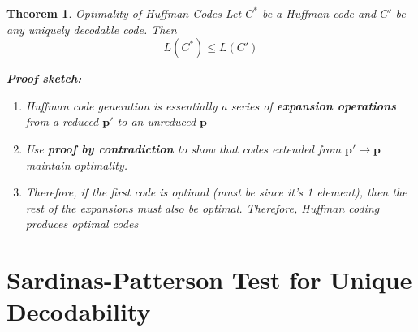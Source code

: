 \documentclass[a4paper,12pt]{report}
\newtheorem{theorem}{Theorem}
\begin{document}
\begin{theorem}{Optimality of Huffman Codes}
Let $C^*$ be a Huffman code and $C'$ be any uniquely decodable code. Then 
\begin{equation}
	L(C^*) \leq L(C')
\end{equation}

\textbf{Proof sketch:} 
\begin{enumerate}
\item Huffman code generation is essentially a series of \textbf{expansion
operations} from a reduced $\mathbf p'$ to an unreduced $\mathbf p$
\item Use \textbf{proof by contradiction} to show that codes extended from
$\mathbf p' \to \mathbf p$ maintain optimality. 
\item Therefore, if the first code is optimal (must be since it's 1 element),
then the rest of the expansions must also be optimal. Therefore, Huffman coding
produces optimal codes \qedsymbol{}
\end{enumerate}
\end{theorem}












\section{Sardinas-Patterson Test for Unique Decodability}
\end{document}
